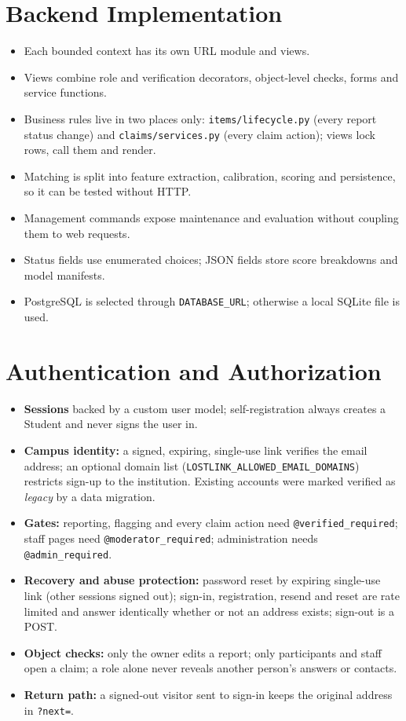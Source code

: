 \documentclass[12pt,a4paper,oneside]{report}
\newcommand{\code}[1]{\texttt{#1}}
\begin{document}
\section{Backend Implementation}
\begin{itemize}
  \item Each bounded context has its own URL module and views.
  \item Views combine role and verification decorators, object-level checks, forms and service functions.
  \item Business rules live in two places only: \code{items/lifecycle.py} (every report status change) and \code{claims/services.py} (every claim action); views lock rows, call them and render.
  \item Matching is split into feature extraction, calibration, scoring and persistence, so it can be tested without HTTP.
  \item Management commands expose maintenance and evaluation without coupling them to web requests.
  \item Status fields use enumerated choices; JSON fields store score breakdowns and model manifests.
  \item PostgreSQL is selected through \code{DATABASE\_URL}; otherwise a local SQLite file is used.
\end{itemize}

\section{Authentication and Authorization}
\begin{itemize}
  \item \textbf{Sessions} backed by a custom user model; self-registration always creates a Student and never signs the user in.
  \item \textbf{Campus identity:} a signed, expiring, single-use link verifies the email address; an optional domain list (\code{LOSTLINK\_ALLOWED\_EMAIL\_DOMAINS}) restricts sign-up to the institution. Existing accounts were marked verified as \emph{legacy} by a data migration.
  \item \textbf{Gates:} reporting, flagging and every claim action need \code{@verified\_required}; staff pages need \code{@moderator\_required}; administration needs \code{@admin\_required}.
  \item \textbf{Recovery and abuse protection:} password reset by expiring single-use link (other sessions signed out); sign-in, registration, resend and reset are rate limited and answer identically whether or not an address exists; sign-out is a POST.
  \item \textbf{Object checks:} only the owner edits a report; only participants and staff open a claim; a role alone never reveals another person's answers or contacts.
  \item \textbf{Return path:} a signed-out visitor sent to sign-in keeps the original address in \code{?next=}.
\end{itemize}
\end{document}
